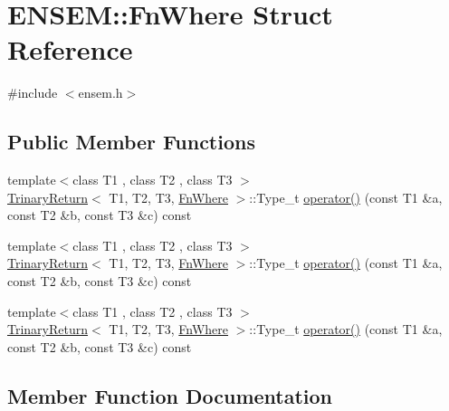 \hypertarget{structENSEM_1_1FnWhere}{}\section{E\+N\+S\+EM\+:\+:Fn\+Where Struct Reference}
\label{structENSEM_1_1FnWhere}


{\ttfamily \#include $<$ensem.\+h$>$}

\subsection*{Public Member Functions}
\begin{DoxyCompactItemize}
\item 
{\footnotesize template$<$class T1 , class T2 , class T3 $>$ }\\\mbox{\hyperlink{structENSEM_1_1TrinaryReturn}{Trinary\+Return}}$<$ T1, T2, T3, \mbox{\hyperlink{structENSEM_1_1FnWhere}{Fn\+Where}} $>$\+::Type\+\_\+t \mbox{\hyperlink{structENSEM_1_1FnWhere_a8aeb5ef42051b473191ace0a8ae74304}{operator()}} (const T1 \&a, const T2 \&b, const T3 \&c) const
\item 
{\footnotesize template$<$class T1 , class T2 , class T3 $>$ }\\\mbox{\hyperlink{structENSEM_1_1TrinaryReturn}{Trinary\+Return}}$<$ T1, T2, T3, \mbox{\hyperlink{structENSEM_1_1FnWhere}{Fn\+Where}} $>$\+::Type\+\_\+t \mbox{\hyperlink{structENSEM_1_1FnWhere_a8aeb5ef42051b473191ace0a8ae74304}{operator()}} (const T1 \&a, const T2 \&b, const T3 \&c) const
\item 
{\footnotesize template$<$class T1 , class T2 , class T3 $>$ }\\\mbox{\hyperlink{structENSEM_1_1TrinaryReturn}{Trinary\+Return}}$<$ T1, T2, T3, \mbox{\hyperlink{structENSEM_1_1FnWhere}{Fn\+Where}} $>$\+::Type\+\_\+t \mbox{\hyperlink{structENSEM_1_1FnWhere_a8aeb5ef42051b473191ace0a8ae74304}{operator()}} (const T1 \&a, const T2 \&b, const T3 \&c) const
\end{DoxyCompactItemize}


\subsection{Member Function Documentation}
\mbox{\label{structENSEM_1_1FnWhere_a8aeb5ef42051b473191ace0a8ae74304}} 
